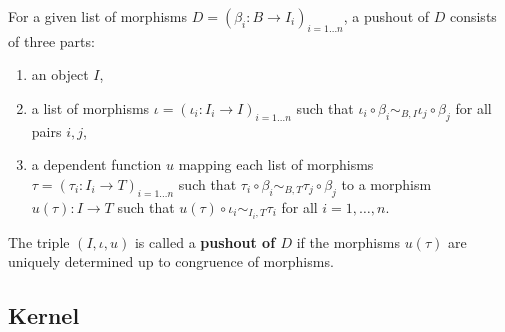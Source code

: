 \begin{definition}
 For a given list of morphisms $D = ( \beta_i: B \rightarrow I_i )_{i = 1 \dots n}$,
 a pushout of $D$ consists of three parts:
 \begin{enumerate}
  \item an object $I$,
  \item a list of morphisms $\iota = ( \iota_i: I_i \rightarrow I )_{i = 1 \dots n}$ such that
        $\iota_i \circ \beta_i \sim_{B,I} \iota_j \circ \beta_j$ for all pairs $i,j$,
  \item a dependent function $u$ mapping each list of morphisms
        $\tau = ( \tau_i: I_i \rightarrow T )_{i = 1 \dots n}$ such that
        $\tau_i \circ \beta_i \sim_{B,T} \tau_j \circ \beta_j$
        to a morphism $u( \tau ): I \rightarrow T$ such that
        $u( \tau ) \circ \iota_i \sim_{I_i, T} \tau_i$ for all $i = 1, \dots, n$.
 \end{enumerate}
  The triple $( I, \iota, u )$ is called a \textbf{pushout of $D$} if the morphisms $u( \tau )$ are uniquely determined up to
  congruence of morphisms.
\end{definition}

\subsection{Kernel}

